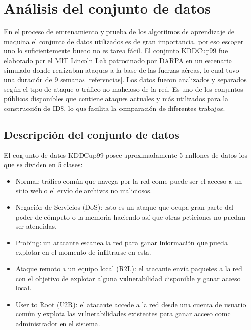 \chapter{Análisis del conjunto de datos}\label{chapter:dataset}

En el proceso de entrenamiento y prueba de los algoritmos de aprendizaje de maquina el conjunto de datos utilizados es de gran importancia, por eso escoger uno lo suficientemente bueno no es tarea fácil. El conjunto KDDCup99 fue elaborado por el MIT Lincoln Lab patrocinado por DARPA en un escenario simulado donde realizaban ataques a la base de las fuerzas aéreas, lo cual tuvo una duración de 9 semanas [referencias]. Los datos fueron analizados y separados según el tipo de ataque o tráfico no malicioso de la red. Es uno de los conjuntos públicos disponibles que contiene ataques actuales y más utilizados para la construcción de IDS, lo que facilita la comparación de diferentes trabajos.

\section{Descripción del conjunto de datos}\label{section:dataset_description}
El conjunto de datos KDDCup99 posee aproximadamente 5 millones de datos los que se dividen en 5 clases:

\begin{itemize}
    \item Normal: tráfico común que navega por la red como puede ser el acceso a un sitio web o el envío de archivos no maliciosos.
    \item Negación de Servicios (DoS): esto es un ataque que ocupa gran parte del poder de cómputo o la memoria haciendo así que otras peticiones no puedan ser atendidas.
    \item Probing: un atacante escanea la red para ganar información que pueda explotar en el momento de infiltrarse en esta.
    \item Ataque remoto a un equipo local (R2L): el atacante envía paquetes a la red con el objetivo de explotar alguna vulnerabilidad disponible y ganar acceso local.
    \item User to Root (U2R): el atacante accede a la red desde una cuenta de usuario común y explota las vulnerabilidades existentes para ganar acceso como administrador en el sistema.
\end{itemize}

